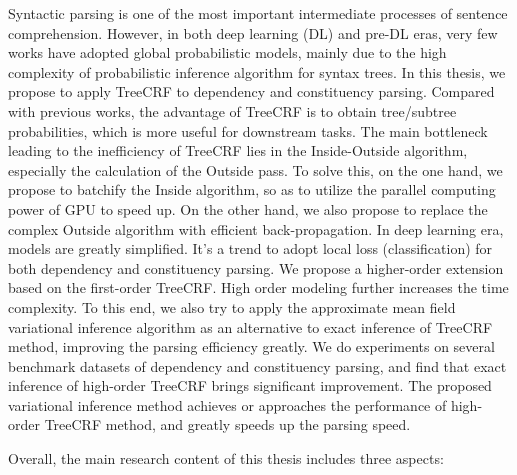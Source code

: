 
\begin{eabstract}
  Syntactic parsing is one of the most important intermediate processes of sentence comprehension.
  However, in both deep learning (DL) and pre-DL eras, very few works have adopted global probabilistic models, mainly due to the high complexity of probabilistic inference algorithm for syntax trees.
  In this thesis, we propose to apply TreeCRF to dependency and constituency parsing.
  Compared with previous works, the advantage of TreeCRF is to obtain tree/subtree probabilities, which is more useful for downstream tasks.
  The main bottleneck leading to the inefficiency of TreeCRF lies in the Inside-Outside algorithm, especially the calculation of the Outside pass.
  To solve this, on the one hand, we propose to batchify the Inside algorithm, so as to utilize the parallel computing power of GPU to speed up.
  On the other hand, we also propose to replace the complex Outside algorithm with efficient back-propagation.
  In deep learning era, models are greatly simplified.
  It's a trend to adopt local loss (classification) for both dependency and constituency parsing.
  We propose a higher-order extension based on the first-order TreeCRF.
  High order modeling further increases the time complexity.
  To this end, we also try to apply the approximate mean field variational inference algorithm as an alternative to exact inference of TreeCRF method, improving the parsing efficiency greatly.
  We do experiments on several benchmark datasets of dependency and constituency parsing, and find that exact inference of high-order TreeCRF brings significant improvement.
  The proposed variational inference method achieves or approaches the performance of high-order TreeCRF method, and greatly speeds up the parsing speed.

  Overall, the main research content of this thesis includes three aspects:


\end{eabstract}
